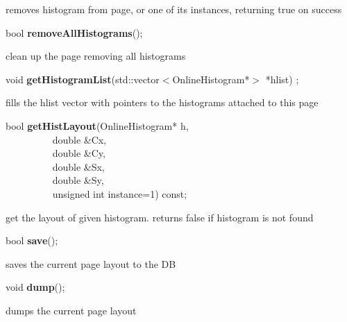  removes histogram from page, or one of its instances, returning true on success


\item    bool {\bf removeAllHistograms}();


 clean up the page removing all histograms


\item    void {\bf getHistogramList}(std::vector$<$OnlineHistogram*$>$ *hlist) ;

 fills the hlist vector with pointers to the histograms attached to this page


\item    bool {\bf getHistLayout}(OnlineHistogram* h,\\\mbox{}~~~~~~~~~
		     double \&Cx,\\\mbox{}~~~~~~~~~
		     double \&Cy,\\\mbox{}~~~~~~~~~
		     double \&Sx,\\\mbox{}~~~~~~~~~
		     double \&Sy,\\\mbox{}~~~~~~~~~
		     unsigned int instance=1) const;

 get the layout of given histogram. returns false if histogram is not found


\item    bool {\bf save}();


 saves the current page layout to the DB


\item    void {\bf dump}();


 dumps the current page layout 


